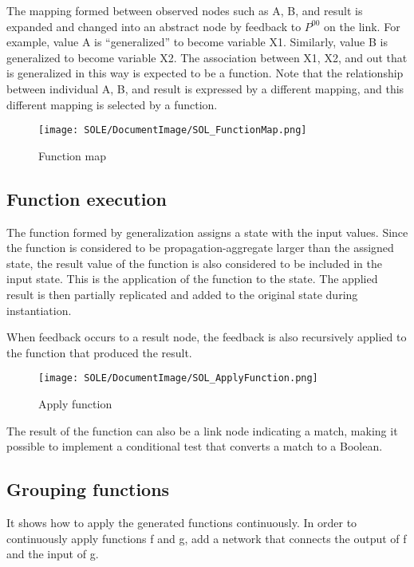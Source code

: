 \documentclass[12pt]{article}
\begin{document}
The mapping formed between observed nodes such as A, B, and result is
expanded and changed into an abstract node by feedback to \(P^{00}\) on
the link. For example, value A is ``generalized'' to become variable X1.
Similarly, value B is generalized to become variable X2. The association
between X1, X2, and out that is generalized in this way is expected to
be a function. Note that the relationship between individual A, B, and
result is expressed by a different mapping, and this different mapping
is selected by a function.

\begin{figure}[ht]
  \centering
  \texttt{[image: SOLE/DocumentImage/SOL\_FunctionMap.png]}
  \caption{Function map}
  \label{fig:function_map}
\end{figure}

\subsection{Function execution}\label{function-execution}

The function formed by generalization assigns a state with the input
values. Since the function is considered to be propagation-aggregate
larger than the assigned state, the result value of the function is also
considered to be included in the input state. This is the application of
the function to the state. The applied result is then partially
replicated and added to the original state during instantiation.

When feedback occurs to a result node, the feedback is also recursively
applied to the function that produced the result.

\begin{figure}[ht]
  \centering
  \texttt{[image: SOLE/DocumentImage/SOL\_ApplyFunction.png]}
  \caption{Apply function}
  \label{fig:apply_function}
\end{figure}

The result of the function can also be a link node indicating a match,
making it possible to implement a conditional test that converts a match
to a Boolean.

\subsection{Grouping functions}\label{grouping-functions}

It shows how to apply the generated functions continuously. In order to
continuously apply functions f and g, add a network that connects the
output of f and the input of g.
\end{document}
